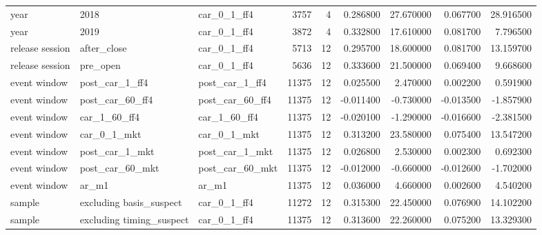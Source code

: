 \begin{table}
\begin{tabular}{lllrrrrrr}
year & 2018 & car\_0\_1\_ff4 & 3757 & 4 & 0.286800 & 27.670000 & 0.067700 & 28.916500 \\
year & 2019 & car\_0\_1\_ff4 & 3872 & 4 & 0.332800 & 17.610000 & 0.081700 & 7.796500 \\
release session & after\_close & car\_0\_1\_ff4 & 5713 & 12 & 0.295700 & 18.600000 & 0.081700 & 13.159700 \\
release session & pre\_open & car\_0\_1\_ff4 & 5636 & 12 & 0.333600 & 21.500000 & 0.069400 & 9.668600 \\
event window & post\_car\_1\_ff4 & post\_car\_1\_ff4 & 11375 & 12 & 0.025500 & 2.470000 & 0.002200 & 0.591900 \\
event window & post\_car\_60\_ff4 & post\_car\_60\_ff4 & 11375 & 12 & -0.011400 & -0.730000 & -0.013500 & -1.857900 \\
event window & car\_1\_60\_ff4 & car\_1\_60\_ff4 & 11375 & 12 & -0.020100 & -1.290000 & -0.016600 & -2.381500 \\
event window & car\_0\_1\_mkt & car\_0\_1\_mkt & 11375 & 12 & 0.313200 & 23.580000 & 0.075400 & 13.547200 \\
event window & post\_car\_1\_mkt & post\_car\_1\_mkt & 11375 & 12 & 0.026800 & 2.530000 & 0.002300 & 0.692300 \\
event window & post\_car\_60\_mkt & post\_car\_60\_mkt & 11375 & 12 & -0.012000 & -0.660000 & -0.012600 & -1.702000 \\
event window & ar\_m1 & ar\_m1 & 11375 & 12 & 0.036000 & 4.660000 & 0.002600 & 4.540200 \\
sample & excluding basis\_suspect & car\_0\_1\_ff4 & 11272 & 12 & 0.315300 & 22.450000 & 0.076900 & 14.102200 \\
sample & excluding timing\_suspect & car\_0\_1\_ff4 & 11375 & 12 & 0.313600 & 22.260000 & 0.075200 & 13.329300 \\
\bottomrule
\end{tabular}
\end{table}
